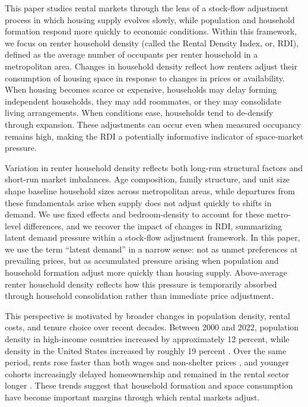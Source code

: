\documentclass[pdflatex,sn-basic]{sn-jnl}%
\theoremstyle{thmstyleone}%
\theoremstyle{thmstyletwo}%
\theoremstyle{thmstylethree}%
\begin{document}
This paper studies rental markets through the lens of a stock-flow adjustment process in which housing supply evolves slowly, while population and household formation respond more quickly to economic conditions. Within this framework, we focus on renter household density (called the Rental Density Index, or, RDI), defined as the average number of occupants per renter household in a metropolitan area. Changes in household density reflect how renters adjust their consumption of housing space in response to changes in prices or availability. When housing becomes scarce or expensive, households may delay forming independent households, they may add roommates, or they may consolidate living arrangements. When conditions ease, households tend to de-densify through expansion. These adjustments can occur even when measured occupancy remains high, making the RDI a potentially informative indicator of space-market pressure.

Variation in renter household density reflects both long-run structural factors and short-run market imbalances. Age composition, family structure, and unit size shape baseline household sizes across metropolitan areas, while departures from these fundamentals arise when supply does not adjust quickly to shifts in demand. We use fixed effects and bedroom-density to account for these metro-level differences, and we recover the impact of changes in RDI, summarizing latent demand pressure within a stock-flow adjustment framework. In this paper, we use the term “latent demand” in a narrow sense: not as unmet preferences at prevailing prices, but as accumulated pressure arising when population and household formation adjust more quickly than housing supply. Above-average renter household density reflects how this pressure is temporarily absorbed through household consolidation rather than immediate price adjustment. 

This perspective is motivated by broader changes in population density, rental costs, and tenure choice over recent decades. Between 2000 and 2022, population density in high-income countries increased by approximately 12 percent, while density in the United States increased by roughly 19 percent \cite{worldbankPopDensity}. Over the same period, rents rose faster than both wages and non-shelter prices \cite{feiveson2024rent, stlouisfedConsumerPrice}, and younger cohorts increasingly delayed homeownership and remained in the rental sector longer \cite{fanniemaeConsumersFeeling}. These trends suggest that household formation and space consumption have become important margins through which rental markets adjust.
\end{document}
